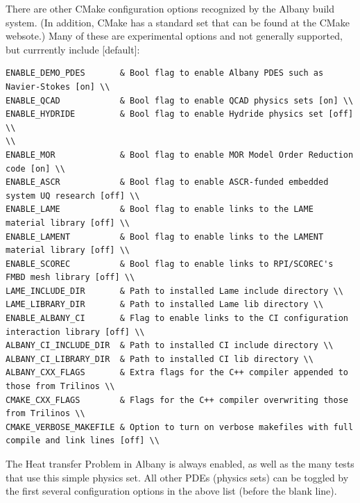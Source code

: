 \documentclass[pdf,12pt,report,strict]{SANDreport}
\theoremstyle{remark}
\begin{document}
There are other CMake configuration options recognized by the
Albany build system. (In addition, CMake has a standard set that
can be found at the CMake websote.) Many of these are experimental
options and not generally supported, but currrently include [default]:
\begin{verbatim}
ENABLE_DEMO_PDES       & Bool flag to enable Albany PDES such as Navier-Stokes [on] \\
ENABLE_QCAD            & Bool flag to enable QCAD physics sets [on] \\
ENABLE_HYDRIDE         & Bool flag to enable Hydride physics set [off] \\
\\
ENABLE_MOR             & Bool flag to enable MOR Model Order Reduction code [on] \\
ENABLE_ASCR            & Bool flag to enable ASCR-funded embedded system UQ research [off] \\
ENABLE_LAME            & Bool flag to enable links to the LAME material library [off] \\
ENABLE_LAMENT          & Bool flag to enable links to the LAMENT material library [off] \\
ENABLE_SCOREC          & Bool flag to enable links to RPI/SCOREC's FMBD mesh library [off] \\
LAME_INCLUDE_DIR       & Path to installed Lame include directory \\
LAME_LIBRARY_DIR       & Path to installed Lame lib directory \\
ENABLE_ALBANY_CI       & Flag to enable links to the CI configuration interaction library [off] \\
ALBANY_CI_INCLUDE_DIR  & Path to installed CI include directory \\
ALBANY_CI_LIBRARY_DIR  & Path to installed CI lib directory \\
ALBANY_CXX_FLAGS       & Extra flags for the C++ compiler appended to those from Trilinos \\
CMAKE_CXX_FLAGS        & Flags for the C++ compiler overwriting those from Trilinos \\
CMAKE_VERBOSE_MAKEFILE & Option to turn on verbose makefiles with full compile and link lines [off] \\
\end{verbatim}

The Heat transfer Problem in Albany is always enabled, as well as the many tests
that use this simple physics set. All other PDEs (physics sets) can be toggled
by the first several configuration options in the above list (before the blank line).
\end{document}
